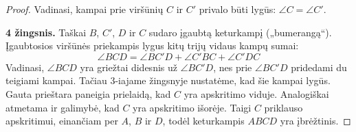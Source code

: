 \documentclass[11pt,a4paper]{scrartcl}
\begin{document}
\begin{proof}
Vadinasi, kampai prie viršūnių $C$ ir $C'$ privalo būti lygūs: $\angle C = \angle C'$.
\begin{center}
\end{center}
\textbf{4 žingsnis.} Taškai $B$, $C'$, $D$ ir $C$ sudaro įgaubtą keturkampį („bumerangą“). Įgaubtosios viršūnės priekampis lygus kitų trijų vidaus kampų sumai:
\begin{equation*}
\angle BCD = \angle BC'D + \angle C'BC + \angle C'DC
\end{equation*}
Vadinasi, $\angle BCD$ yra griežtai didesnis už $\angle BC'D$, nes prie $\angle BC'D$ pridedami du teigiami kampai. Tačiau 3-iajame žingsnyje nustatėme, kad šie kampai lygūs. Gauta prieštara paneigia prielaidą, kad $C$ yra apskritimo viduje. Analogiškai atmetama ir galimybė, kad $C$ yra apskritimo išorėje. Taigi $C$ priklauso apskritimui, einančiam per $A$, $B$ ir $D$, todėl keturkampis $ABCD$ yra įbrėžtinis.
\end{proof}
\end{document}
